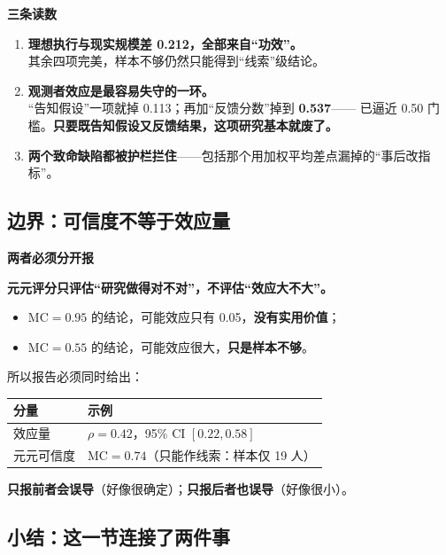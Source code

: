 \documentclass[UTF8,a4paper,11pt]{ctexart}
\newenvironment{explainbox}[1]
{\begin{center}\begin{minipage}{0.94\textwidth}\colorbox{boxbg}{\parbox{0.92\textwidth}{\textbf{#1}\par\vspace{2pt}}}}
{\end{minipage}\end{center}}
\begin{document}
\begin{explainbox}{三条读数}
\begin{enumerate}[leftmargin=1.4em,itemsep=2pt]
\item \textbf{理想执行与现实规模差 0.212，全部来自“功效”。}\\
      其余四项完美，样本不够仍然只能得到“线索”级结论。
\item \textbf{观测者效应是最容易失守的一环。}\\
      “告知假设”一项就掉 0.113；再加“反馈分数”掉到 \textbf{0.537}——
      已逼近 0.50 门槛。\textbf{只要既告知假设又反馈结果，这项研究基本就废了。}
\item \textbf{两个致命缺陷都被护栏拦住}——包括那个用加权平均差点漏掉的“事后改指标”。
\end{enumerate}
\end{explainbox}

\subsection{边界：可信度不等于效应量}

\begin{explainbox}{两者必须分开报}
\textbf{元元评分只评估“研究做得对不对”，不评估“效应大不大”。}
\begin{itemize}[leftmargin=1.4em,itemsep=1pt]
\item $\text{MC} = 0.95$ 的结论，可能效应只有 0.05，\textbf{没有实用价值}；
\item $\text{MC} = 0.55$ 的结论，可能效应很大，\textbf{只是样本不够}。
\end{itemize}
所以报告必须同时给出：

\begin{center}
\begin{tabular}{ll}
\toprule
\textbf{分量} & \textbf{示例} \\
\midrule
效应量 & $\rho = 0.42$，95\% CI $[0.22, 0.58]$ \\
元元可信度 & $\text{MC} = 0.74$（只能作线索：样本仅 19 人） \\
\bottomrule
\end{tabular}
\end{center}
\textbf{只报前者会误导}（好像很确定）；\textbf{只报后者也误导}（好像很小）。
\end{explainbox}

\subsection{小结：这一节连接了两件事}
\end{document}
